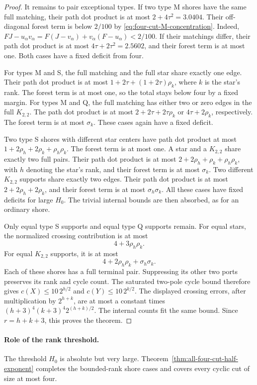 \begin{proof}
It remains to pair exceptional types.
If two type M shores have the same full matching, their path dot product
is at most $2+4\tau^2=3.0404$.
Their off-diagonal forest term is below $2/100$ by
\eqref{eq:four-cut-M-concentration}.
Indeed, $FJ-u_\alpha v_\alpha
=F(J-v_\alpha)+v_\alpha(F-u_\alpha)<2/100$.
If their matchings differ, their path dot product is at most
$4\tau+2\tau^2=2.5602$, and their forest term is at most one.
Both cases have a fixed deficit from four.

For types M and S, the full matching and the full star share exactly one edge.
Their path dot product is at most
$1+2\tau+(1+2\tau)\rho_k$,
where $k$ is the star's rank.
The forest term is at most one, so the total stays below four by a fixed margin.
For types M and Q, the full matching has either two or zero edges in the
full $K_{2,2}$.
The path dot product is at most $2+2\tau+2\tau\rho_k$ or
$4\tau+2\rho_k$, respectively.
The forest term is at most $\sigma_k$.
These cases again have a fixed deficit.

Two type S shores with different star centers have path dot product at most
$1+2\rho_h+2\rho_k+\rho_h\rho_k$.
The forest term is at most one.
A star and a $K_{2,2}$ share exactly two full pairs.
Their path dot product is at most $2+2\rho_h+\rho_k+\rho_h\rho_k$,
with $h$ denoting the star's rank, and their forest term is at most $\sigma_k$.
Two different $K_{2,2}$ supports share exactly two edges.
Their path dot product is at most $2+2\rho_h+2\rho_k$,
and their forest term is at most $\sigma_h\sigma_k$.
All these cases have fixed deficits for large $H_0$.
The trivial internal bounds are then absorbed, as for an ordinary shore.

Only equal type S supports and equal type Q supports remain.
For equal stars, the normalized crossing contribution is at most
\[
 4+3\rho_h\rho_k.
\]
For equal $K_{2,2}$ supports, it is at most
\[
 4+2\rho_h\rho_k+\sigma_h\sigma_k.
\]
Each of these shores has a full terminal pair.
Suppressing its other two ports preserves its rank and cycle count.
The saturated two-pole cycle bound therefore gives
$c(X)\le10\,2^{h/2}$ and $c(Y)\le10\,2^{k/2}$.
The displayed crossing errors, after multiplication by $2^{h+k}$, are
at most a constant times
$(h+3)^4(k+3)^4 2^{(h+k)/2}$.
The internal counts fit the same bound.
Since $r=h+k+3$, this proves the theorem.
\end{proof}

\paragraph{Role of the rank threshold.}
The threshold $H_0$ is absolute but very large.
Theorem~\ref{thm:all-four-cut-half-exponent} completes the bounded-rank
shore cases and covers every cyclic cut of size at most four.
